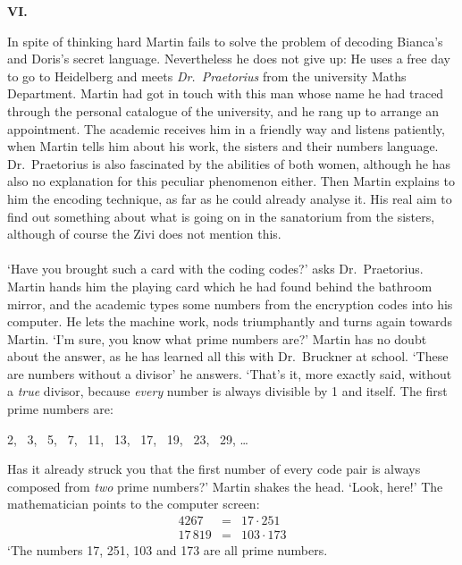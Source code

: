 
\begin{center} 
{\bf VI.} 
\end{center} 
In spite of thinking hard Martin fails to solve the problem of decoding Bianca's and Doris's secret language. 
Nevertheless he does not give up: He uses a free day to go to Heidelberg and meets {\em Dr.~Praetorius\/} 
from the university Maths Department. 
Martin had got in touch with this man whose name he had traced through the personal catalogue of the university, 
and he rang up to arrange an appointment. 
The academic receives him in a friendly way and listens patiently, when Martin tells him about his work, the sisters and 
their numbers language.
Dr.~Praetorius is also fascinated by the abilities of both women, although he has also no explanation for this 
peculiar phenomenon either.
Then Martin explains to him the encoding technique, as far as he could already analyse it.
His real aim to find out something about what is going on in the sanatorium from the sisters, although of course 
the Zivi does not mention this. \\ \\ 
`Have you brought such a card with the coding codes?' asks Dr.~Praetorius. 
Martin hands him the playing card which he had found behind the bathroom mirror, and the academic 
types some numbers from the encryption codes into his computer. 
He lets the machine work, nods triumphantly and turns again towards Martin.
`I'm sure, you know what prime numbers are?' 
Martin has no doubt about the answer, as he has learned all this with Dr.~Bruckner at school. 
`These are numbers without a divisor' he answers. `That's it, more exactly said, without a {\em true\/} divisor, 
because {\em every\/} number is always divisible by 1 and itself. 
The first prime numbers are:
\begin{center} 
2, \, 3, \, 5, \, 7, \, 11, \, 13, \, 17, \, 19, \, 23, \, 29, \quad 
\dots 
\end{center} 
Has it already struck you that the first number of every code pair is always composed from {\em two\/} prime numbers?'
Martin shakes the head. 
`Look, here!' 
The mathematician points to the computer screen: 
\[\begin{array}{rcc}
4267 & = & 17\cdot 251 \\
17\,819 & = & 103\cdot 173
\end{array} \]
`The numbers 17, 251, 103 and 173 are all prime numbers. 
